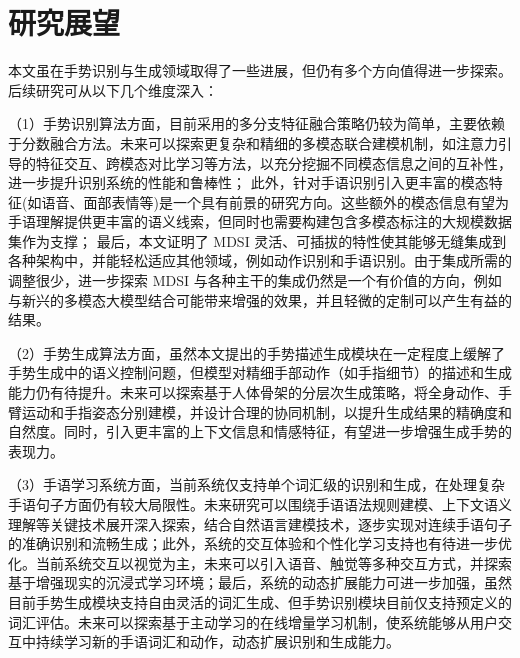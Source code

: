 \section{研究展望}
本文虽在手势识别与生成领域取得了一些进展，但仍有多个方向值得进一步探索。后续研究可从以下几个维度深入：

（1）手势识别算法方面，目前采用的多分支特征融合策略仍较为简单，主要依赖于分数融合方法。未来可以探索更复杂和精细的多模态联合建模机制，如注意力引导的特征交互、跨模态对比学习等方法，以充分挖掘不同模态信息之间的互补性，进一步提升识别系统的性能和鲁棒性；
此外，针对手语识别引入更丰富的模态特征(如语音、面部表情等)是一个具有前景的研究方向。这些额外的模态信息有望为手语理解提供更丰富的语义线索，但同时也需要构建包含多模态标注的大规模数据集作为支撑；
最后，本文证明了 MDSI 灵活、可插拔的特性使其能够无缝集成到各种架构中，并能轻松适应其他领域，例如动作识别和手语识别。由于集成所需的调整很少，进一步探索 MDSI 与各种主干的集成仍然是一个有价值的方向，例如与新兴的多模态大模型结合可能带来增强的效果，并且轻微的定制可以产生有益的结果。

（2）手势生成算法方面，虽然本文提出的手势描述生成模块在一定程度上缓解了手势生成中的语义控制问题，但模型对精细手部动作（如手指细节）的描述和生成能力仍有待提升。未来可以探索基于人体骨架的分层次生成策略，将全身动作、手臂运动和手指姿态分别建模，并设计合理的协同机制，以提升生成结果的精确度和自然度。同时，引入更丰富的上下文信息和情感特征，有望进一步增强生成手势的表现力。

（3）手语学习系统方面，当前系统仅支持单个词汇级的识别和生成，在处理复杂手语句子方面仍有较大局限性。未来研究可以围绕手语语法规则建模、上下文语义理解等关键技术展开深入探索，结合自然语言建模技术，逐步实现对连续手语句子的准确识别和流畅生成；此外，系统的交互体验和个性化学习支持也有待进一步优化。当前系统交互以视觉为主，未来可以引入语音、触觉等多种交互方式，并探索基于增强现实的沉浸式学习环境；最后，系统的动态扩展能力可进一步加强，虽然目前手势生成模块支持自由灵活的词汇生成、但手势识别模块目前仅支持预定义的词汇评估。未来可以探索基于主动学习的在线增量学习机制，使系统能够从用户交互中持续学习新的手语词汇和动作，动态扩展识别和生成能力。
